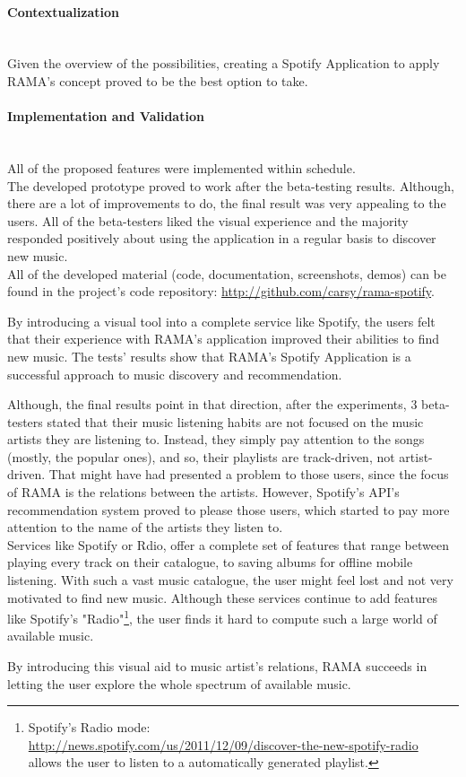 \documentclass[twocolumn]{article}
\begin{document}
  \paragraph*{Contextualization} \hfill \\
  \indent Given the overview of the possibilities, creating a Spotify Application to apply RAMA's concept proved to be the best option to take.

  \paragraph*{Implementation and Validation} \hfill \\
  \indent All of the proposed features were implemented within schedule. \\
  The developed prototype proved to work after the beta-testing results.
  Although, there are a lot of improvements to do, the final result was very appealing to the users.
  All of the beta-testers liked the visual experience and the majority responded positively about using the application in a regular basis to discover new music. \\

  All of the developed material (code, documentation, screenshots, demos) can be found in the project's code repository: \url{http://github.com/carsy/rama-spotify}.


  By introducing a visual tool into a complete service like Spotify, the users felt that their experience with RAMA's application improved their abilities to find new music.
  The tests' results show that RAMA's Spotify Application is a successful approach to music discovery and recommendation.

  Although, the final results point in that direction, after the experiments, 3 beta-testers stated that their music listening habits are not focused on the music artists they are listening to. Instead, they simply pay attention to the songs (mostly, the popular ones), and so, their playlists are track-driven, not artist-driven.
  That might have had presented a problem to those users, since the focus of RAMA is the relations between the artists.
  However, Spotify's API's recommendation system proved to please those users, which started to pay more attention to the name of the artists they listen to. \\

  Services like Spotify or Rdio, offer a complete set of features that range between playing every track on their catalogue, to saving albums for offline mobile listening.
  With such a vast music catalogue, the user might feel lost and not very motivated to find new music.
  Although these services continue to add features like Spotify's "Radio"\footnote{Spotify's Radio mode: \\
  \url{http://news.spotify.com/us/2011/12/09/discover-the-new-spotify-radio} \\ allows the user to listen to a automatically generated playlist.}, the user finds it hard to compute such a large world of available music.

  By introducing this visual aid to music artist's relations, RAMA succeeds in letting the user explore the whole spectrum of available music.



\end{document}
